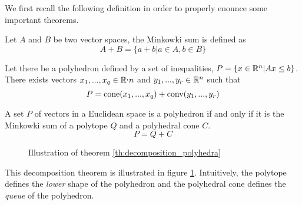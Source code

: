 We first recall the following definition in order to properly enounce some important theorems. 

\begin{definition}
    Let $A$ and $B$ be two vector spaces, the Minkowki sum is defined as
    \[
        A + B = \{ a + b | a\in A, b\in B \}
    \]
\end{definition}

\begin{theorem}
    Let there be a polyhedron defined by a set of inequalities, $P = \{ x\in\mathbb R^n | Ax\le b \}$. There exists vectors $x_1,...,x_q\in\mathbb R^,n$ and $y_1,...,y_r\in\mathbb R^n$ such that
    \[
        P = \textrm{cone}(x_1,...,x_q) + \textrm{conv}(y_1,...,y_r)
    \]
\end{theorem}

\begin{theorem}
    \label{th:decomposition_polyhedra}
    A set $P$ of vectors in a Euclidean space is a polyhedron if and only if it is the Minkowki sum of a polytope $Q$ and a polyhedral cone $C$. 
    \[
        P = Q + C
    \]
\end{theorem}

\begin{figure}[h!]
    \centering
    \caption{Illustration of theorem \ref{th:decomposition_polyhedra}}
    \label{fig:decomposition_polyhedra}
\end{figure}

This decomposition theorem is illustrated in figure \ref{fig:decomposition_polyhedra}. Intuitively, the polytope defines the \textit{lower} shape of the polyhedron and the polyhedral cone defines the \textit{queue} of the polyhedron. 
